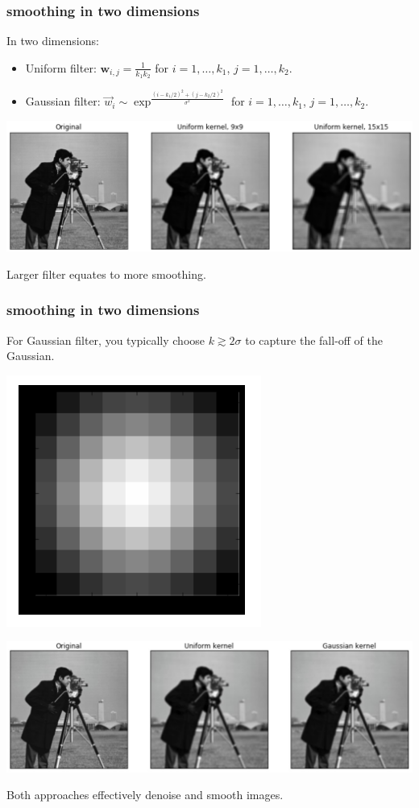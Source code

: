 \documentclass[handout,compress]{beamer}
\newcommand{\bv}[1]{\mathbf{#1}}
\begin{document}
	\begin{frame}
	\frametitle{smoothing in two dimensions}
	In two dimensions:
	\begin{itemize}
		\item Uniform filter: $\bv{w}_{i,j} = \frac{1}{k_1k_2}$ for $i = 1,\ldots, k_1$, $j = 1,\ldots, k_2$.
		\item Gaussian filter: $\vec{w}_i \sim \exp^{\frac{(i-k_1/2)^2 + (j-k_2/2)^2}{\sigma^2}}$ for $i = 1,\ldots, k_1$, $j = 1,\ldots, k_2$.
	\end{itemize}
\begin{center}
	\includegraphics[width=.8\textwidth]{uniform.png}
	
	Larger filter equates to more smoothing. 
\end{center}
	\end{frame}

\begin{frame}
	\frametitle{smoothing in two dimensions}
	For Gaussian filter, you typically choose $k \gtrsim 2\sigma$ to capture the fall-off of the Gaussian. 
	\begin{center}
		\includegraphics[width=.2\textwidth]{gaussian_filter.png}
		
		
		\includegraphics[width=.8\textwidth]{uniform_vs_gauss.png}
	\end{center}

	Both approaches effectively denoise and smooth images. 
\end{frame}
\end{document}
